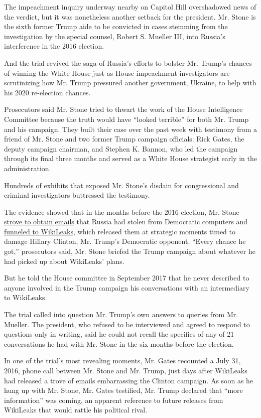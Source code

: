 The impeachment inquiry underway nearby on Capitol Hill overshadowed
news of the verdict, but it was nonetheless another setback for the
president. Mr. Stone is the sixth former Trump aide to be convicted in
cases stemming from the investigation by the special counsel, Robert S.
Mueller III, into Russia's interference in the 2016 election.

And the trial revived the saga of Russia's efforts to bolster Mr.
Trump's chances of winning the White House just as House impeachment
investigators are scrutinizing how Mr. Trump pressured another
government, Ukraine, to help with his 2020 re-election chances.

Prosecutors said Mr. Stone tried to thwart the work of the House
Intelligence Committee because the truth would have ``looked terrible''
for both Mr. Trump and his campaign. They built their case over the past
week with testimony from a friend of Mr. Stone and two former Trump
campaign officials: Rick Gates, the deputy campaign chairman, and
Stephen K. Bannon, who led the campaign through its final three months
and served as a White House strategist early in the administration.

Hundreds of exhibits that exposed Mr. Stone's disdain for congressional
and criminal investigators buttressed the testimony.

The evidence showed that in the months before the 2016 election, Mr.
Stone
\href{https://www.nytimes.com/2018/11/27/us/politics/jerome-corsi-roger-stone-wikileaks.html}{strove
to obtain emails} that Russia had stolen from Democratic computers and
\href{https://www.nytimes.com/2019/01/28/podcasts/the-daily/roger-stone-trump-mueller-wikileaks.html}{funneled
to WikiLeaks}, which released them at strategic moments timed to damage
Hillary Clinton, Mr. Trump's Democratic opponent. ``Every chance he
got,'' prosecutors said, Mr. Stone briefed the Trump campaign about
whatever he had picked up about WikiLeaks' plans.

But he told the House committee in September 2017 that he never
described to anyone involved in the Trump campaign his conversations
with an intermediary to WikiLeaks.

The trial called into question Mr. Trump's own answers to queries from
Mr. Mueller. The president, who refused to be interviewed and agreed to
respond to questions only in writing, said he could not recall the
specifics of any of 21 conversations he had with Mr. Stone in the six
months before the election.

In one of the trial's most revealing moments, Mr. Gates recounted a July
31, 2016, phone call between Mr. Stone and Mr. Trump, just days after
WikiLeaks had released a trove of emails embarrassing the Clinton
campaign. As soon as he hung up with Mr. Stone, Mr. Gates testified, Mr.
Trump declared that ``more information'' was coming, an apparent
reference to future releases from WikiLeaks that would rattle his
political rival.

